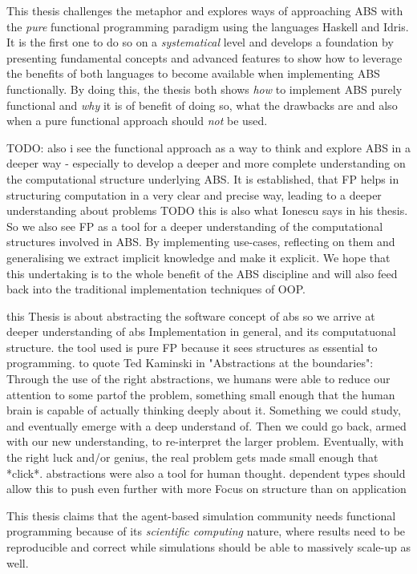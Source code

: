 This thesis challenges the metaphor and explores ways of approaching ABS with the \textit{pure} functional programming paradigm using the languages Haskell and Idris. It is the first one to do so on a \textit{systematical} level and develops a foundation by presenting fundamental concepts and advanced features to show how to leverage the benefits of both languages \cite{hudak_history_2007, brady_idris_2013} to become available when implementing ABS functionally. By doing this, the thesis both shows \textit{how} to implement ABS purely functional and \textit{why} it is of benefit of doing so, what the drawbacks are and also when a pure functional approach should \textit{not} be used. 

TODO: also i see the functional approach as a way to think and explore ABS in a deeper way - especially to develop a deeper and more complete understanding on the computational structure underlying ABS. It is established, that FP helps in structuring computation in a very clear and precise way, leading to a deeper understanding about problems TODO this is also what Ionescu says in his thesis. So we also see FP as a tool for a deeper understanding of the computational structures involved in ABS. By implementing use-cases, reflecting on them and generalising we extract implicit knowledge and make it explicit. We hope that this undertaking is to the whole benefit of the ABS discipline and will also feed back into the traditional implementation techniques of OOP.

this Thesis is about abstracting the software concept of abs so we arrive at deeper understanding of abs Implementation in general, and its computatuonal structure. the tool used is pure FP because it sees structures as essential to programming. to quote Ted Kaminski in "Abstractions at the boundaries": Through the use of the right abstractions, we humans were able to reduce our attention to some partof the problem, something small enough that the human brain is capable of actually thinking deeply about it. Something we could study, and eventually emerge with a deep understand of. Then we could go back, armed with our new understanding, to re-interpret the larger problem. Eventually, with the right luck and/or genius, the real problem gets made small enough that *click*. abstractions were also a tool for human thought.
dependent types should allow this to push even further with more Focus on structure than on application

This thesis claims that the agent-based simulation community needs functional programming because of its \textit{scientific computing} nature, where results need to be reproducible and correct while simulations should be able to massively scale-up as well. %

